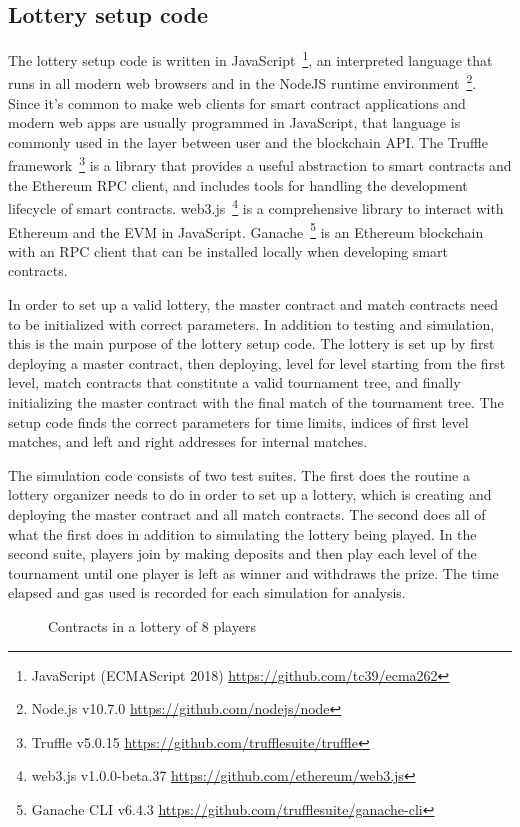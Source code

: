 


\subsection{Lottery setup code}
The lottery setup code is written in JavaScript~\footnote{JavaScript (ECMAScript 2018) \url{https://github.com/tc39/ecma262}}, an interpreted language that runs in all modern web browsers and in the NodeJS runtime environment~\footnote{Node.js v10.7.0 \url{https://github.com/nodejs/node}}. Since it's common to make web clients for smart contract applications and modern web apps are usually programmed in JavaScript, that language is commonly used in the layer between user and the blockchain API. The Truffle framework~\footnote{Truffle v5.0.15 \url{https://github.com/trufflesuite/truffle}} is a library that provides a useful abstraction to smart contracts and the Ethereum RPC client, and includes tools for handling the development lifecycle of smart contracts. web3.js~\footnote{web3.js v1.0.0-beta.37 \url{https://github.com/ethereum/web3.js}} is a comprehensive library to interact with Ethereum and the EVM in JavaScript. Ganache~\footnote{Ganache CLI v6.4.3 \url{https://github.com/trufflesuite/ganache-cli}} is an Ethereum blockchain with an RPC client that can be installed locally when developing smart contracts.

In order to set up a valid lottery, the master contract and match contracts need to be initialized with correct parameters. In addition to testing and simulation, this is the main purpose of the lottery setup code. The lottery is set up by first deploying a master contract, then deploying, level for level starting from the first level, match contracts that constitute a valid tournament tree, and finally initializing the master contract with the final match of the tournament tree. The setup code finds the correct parameters for time limits, indices of first level matches, and left and right addresses for internal matches. 

The simulation code consists of two test suites. The first does the routine a lottery organizer needs to do in order to set up a lottery, which is creating and deploying the master contract and all match contracts. The second does all of what the first does in addition to simulating the lottery being played. In the second suite, players join by making deposits and then play each level of the tournament until one player is left as winner and withdraws the prize.
The time elapsed and gas used is recorded for each simulation for analysis.

\begin{figure}[htbp]
  \centering
  
  \caption{Contracts in a lottery of 8 players}
\end{figure}
